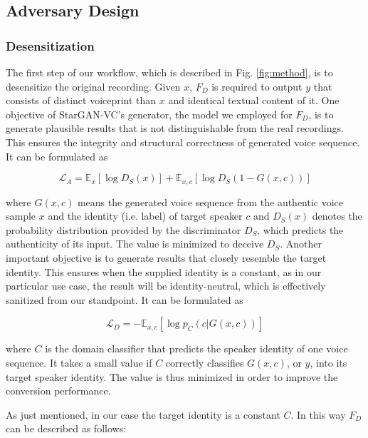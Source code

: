 \documentclass[conference]{IEEEtran}
\begin{document}
\subsection{Adversary Design}

\subsubsection{Desensitization}

The first step of our workflow, which is described in Fig. \ref{fig:method}, is to desensitize the original recording. Given $x$, $F_D$ is required to output $y$ that consists of distinct voiceprint than $x$ and identical textual content of it. One objective of StarGAN-VC\cite{a3}'s generator, the model we employed for $F_D$, is to generate plausible results that is not distinguishable from the real recordings. This ensures the integrity and structural correctness of generated voice sequence. It can be formulated as

\begin{equation}
    \label{eqn:adv_loss}
    \mathcal{L}_A = \mathbb{E}_{x}[\log D_S(x)] + \mathbb{E}_{x, c}[\log D_S(1 - G(x, c))]
\end{equation}

where $G(x, c)$ means the generated voice sequence from the authentic voice sample $x$ and the identity (i.e. label) of target speaker $c$ and $D_S(x)$ denotes the probability distribution provided by the discriminator $D_S$, which predicts the authenticity of its input. The value is minimized to deceive $D_S$. Another important objective is to generate results that closely resemble the target identity. This ensures when the supplied identity is a constant, as in our particular use case, the result will be identity-neutral, which is effectively sanitized from our standpoint. It can be formulated as

\begin{equation}
    \label{eqn:dom_loss}
    \mathcal{L}_D = - \mathbb{E}_{x, c}[\log p_C(c | G(x, c))]
\end{equation}

where $C$ is the domain classifier that predicts the speaker identity of one voice sequence. It takes a small value if $C$ correctly classifies $G(x, c)$, or $y$, into its target speaker identity. The value is thus minimized in order to improve the conversion performance.

As just mentioned, in our case the target identity is a constant $C$. In this way $F_D$ can be described as follows:
\end{document}

